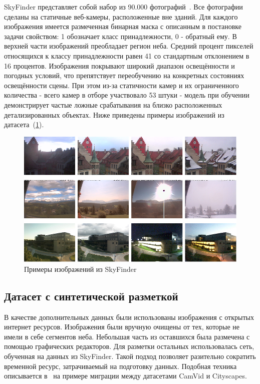 SkyFinder представляет собой набор из 90.000 фотографий~\autocite{mihail2016sky}.
Все фотографии сделаны на статичные веб-камеры, расположенные вне зданий.
Для каждого изображения имеется размеченная бинарная маска с описанным в постановке задачи свойством: 1 обозначает класс принадлежности, 0 - обратный ему.
В верхней части изображений преобладает регион неба.
Средний процент пикселей относящихся к классу принадлежности равен 41 со стандартным отклонением в 16 процентов.
Изображения покрывают широкий диапазон освещённости и погодных условий, что препятствует переобучению на конкретных состояниях освещённости сцены.
При этом из-за статичности камер и их ограниченного количества - всего камер в отборе участвовало 53 штуки - модель при обучении
демонстрирует частые ложные срабатывания на близко расположенных детализированных объектах.
Ниже приведены примеры изображений из датасета~(\ref{fig:skyfinder}).

\begin{figure}[H]
    \centering
    \includegraphics[width=\textwidth]{img/skyfinder.png}
    \caption{Примеры изображений из SkyFinder}
    \label{fig:skyfinder}
\end{figure}


\subsection{Датасет с синтетической разметкой}

В качестве дополнительных данных были использованы изображения с открытых интернет ресурсов.
Изображения были вручную очищены от тех, которые не имели в себе сегментов неба.
Небольшая часть из оставшихся была размечена с помощью графических редакторов.
Для разметки остальных использовалась сеть, обученная на данных из SkyFinder.
Такой подход позволяет разительно сократить временной ресурс, затрачиваемый на подготовку данных.
Подобная техника описывается в~\autocite{zhu2020improving} на примере миграции между датасетами CamVid и Cityscapes.

